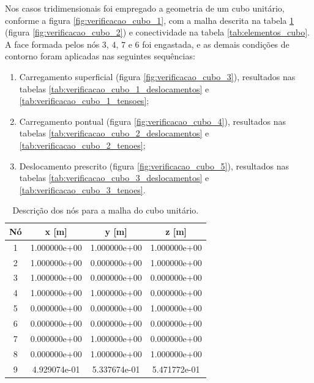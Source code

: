 Nos casos tridimensionais foi empregado a geometria de um cubo unitário, conforme a figura \ref{fig:verificacao_cubo_1}, com a malha descrita na tabela \ref{tab:nos_cubo} (figura \ref{fig:verificacao_cubo_2}) e conectividade na tabela \ref{tab:elementos_cubo}. A face formada pelos nós $3$, $4$, $7$ e $6$ foi engastada, e as demais condições de contorno foram aplicadas nas seguintes sequências:

\begin{enumerate}
    \item Carregamento superficial (figura \ref{fig:verificacao_cubo_3}), resultados nas tabelas \ref{tab:verificacao_cubo_1_deslocamentos} e \ref{tab:verificacao_cubo_1_tensoes};
    \item Carregamento pontual (figura \ref{fig:verificacao_cubo_4}), resultados nas tabelas \ref{tab:verificacao_cubo_2_deslocamentos} e \ref{tab:verificacao_cubo_2_tenoes};
    \item Deslocamento prescrito (figura \ref{fig:verificacao_cubo_5}), resultados nas tabelas \ref{tab:verificacao_cubo_3_deslocamentos} e \ref{tab:verificacao_cubo_3_tenoes}.
\end{enumerate}

\begin{table}
    \centering
    \caption{Descrição dos nós para a malha do cubo unitário.}
    \begin{tabular}{c | c c c}
        \toprule
        \textbf{Nó} & \textbf{x} [m]  & \textbf{y}  [m]  & \textbf{z}  [m]  \\
        \midrule
        1 & 1.000000e+00 & 1.000000e+00 & 1.000000e+00 \\
        2 & 1.000000e+00 & 0.000000e+00 & 1.000000e+00 \\
        3 & 1.000000e+00 & 0.000000e+00 & 0.000000e+00 \\
        4 & 1.000000e+00 & 1.000000e+00 & 0.000000e+00 \\
        5 & 0.000000e+00 & 0.000000e+00 & 1.000000e+00 \\
        6 & 0.000000e+00 & 0.000000e+00 & 0.000000e+00 \\
        7 & 0.000000e+00 & 1.000000e+00 & 0.000000e+00 \\
        8 & 0.000000e+00 & 1.000000e+00 & 1.000000e+00 \\
        9 & 4.929074e-01 & 5.337674e-01 & 5.471772e-01 \\
        \bottomrule
    \end{tabular}
    \label{tab:nos_cubo}
\end{table}

